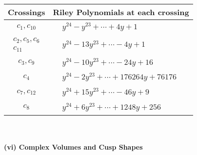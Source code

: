 \documentclass[1p]{elsarticle_modified}
\theoremstyle{definition}
\begin{document}
\begin{tabular}{m{50pt}|m{274pt}}
Crossings & \hspace{64pt}Riley Polynomials at each crossing \\
\hline $$\begin{aligned}c_{1},c_{10}\end{aligned}$$&$\begin{aligned}
&y^{24}- y^{23}+\cdots+4 y+1
\end{aligned}$\\
\hline $$\begin{aligned}c_{2},c_{5},c_{6}\\c_{11}\end{aligned}$$&$\begin{aligned}
&y^{24}-13 y^{23}+\cdots-4 y+1
\end{aligned}$\\
\hline $$\begin{aligned}c_{3},c_{9}\end{aligned}$$&$\begin{aligned}
&y^{24}-10 y^{23}+\cdots-24 y+16
\end{aligned}$\\
\hline $$\begin{aligned}c_{4}\end{aligned}$$&$\begin{aligned}
&y^{24}-2 y^{23}+\cdots+176264 y+76176
\end{aligned}$\\
\hline $$\begin{aligned}c_{7},c_{12}\end{aligned}$$&$\begin{aligned}
&y^{24}+15 y^{23}+\cdots-46 y+9
\end{aligned}$\\
\hline $$\begin{aligned}c_{8}\end{aligned}$$&$\begin{aligned}
&y^{24}+6 y^{23}+\cdots+1248 y+256
\end{aligned}$\\
\hline
\end{tabular}\\~\\
\newpage\flushleft \textbf{(vi) Complex Volumes and Cusp Shapes}
\end{document}

